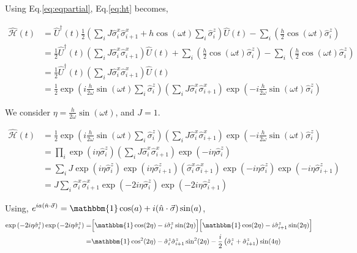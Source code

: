 \documentclass[a4paper,11pt]{article}
\begin{document}
Using Eq.\eqref{eq:eqpartial}, Eq.\eqref{eq:ht} becomes,


\begin{align*}
\hat{\mathcal{H}}(t) & =\hat{U}^{\dagger}(t) \frac{1}{2}\left(\sum_{i} J \hat{\sigma}_{i}^{x} \hat{\sigma}_{i+1}^{x}+h \cos (\omega t) \sum_{i} \hat{\sigma}_{i}^{z}\right) \hat{U}(t)-\sum_{i}\left(\frac{h}{2} \cos (\omega t) \hat{\sigma}_{i}^{z}\right) \nonumber\\
& =\frac{1}{2} \hat{U}^{\dagger}(t)\left(\sum_{i} J \hat{\sigma}_{i}^{x} \hat{\sigma}_{i+1}^{x}\right) \hat{U}(t)+\sum_{i}\left(\frac{h}{2} \cos (\omega t) \hat{\sigma}_{i}^{z}\right)-\sum_{i}\left(\frac{h}{2} \cos (\omega t) \hat{\sigma}_{i}^{z}\right) \nonumber\\
& =\frac{1}{2} \hat{U}^{\dagger}(t)\left(\sum_{i} J \hat{\sigma}_{i}^{x} \hat{\sigma}_{i+1}^{x}\right) \hat{U}(t) \nonumber\\
& =\frac{1}{2} \exp \left(i \frac{h}{2 \omega} \sin (\omega t) \sum_{i} \hat{\sigma}_{i}^{z}\right)\left(\sum_{i} J \hat{\sigma}_{i}^{x} \hat{\sigma}_{i+1}^{x}\right) \exp \left(-i \frac{h}{2 \omega} \sin (\omega t) \hat{\sigma}_{i}^{z}\right)\nonumber
\end{align*}

We consider $\eta=\frac{h}{2 \omega} \sin (\omega t)$, and $J=1$.


\begin{align}
\hat{\mathcal{H}}(t) & =\frac{1}{2} \exp \left(i \frac{h}{2 \omega} \sin (\omega t) \sum_{i} \hat{\sigma}_{i}^{z}\right)\left(\sum_{i} J \hat{\sigma}_{i}^{x} \hat{\sigma}_{i+1}^{x}\right) \exp \left(-i \frac{h}{2 \omega} \sin (\omega t) \hat{\sigma}_{i}^{z}\right) \nonumber\\
&= \prod_i \exp\left(i\eta\hat{\sigma}^z_i\right)\left(\sum_{i} J \hat{\sigma}_{i}^{x} \hat{\sigma}_{i+1}^{x}\right)\exp\left(-i\eta\hat{\sigma}^z_i\right)\nonumber\\
&= \sum_i J \exp(i\eta\hat{\sigma}^z_i)\exp(i\eta\hat{\sigma}^z_{i+1})\left( \hat{\sigma}_{i}^{x} \hat{\sigma}_{i+1}^{x}\right)\exp(-i\eta\hat{\sigma}^z_i)\exp(-i\eta\hat{\sigma}^z_{i+1})\nonumber\\
&= J\sum_{i} \hat{\sigma}_{i}^{x} \hat{\sigma}_{i+1}^{x}\exp(-2i\eta\hat{\sigma}^z_i)\exp(-2i\eta\hat{\sigma}^z_{i+1})
\label{eq:hmov}
\end{align}

Using, $\displaystyle e^{ia(\hat{n}\cdot \vec{\sigma})} = \mathbbm{1} \cos(a) + i (\hat{n}\cdot \vec{\sigma})\sin(a)$, 
\begin{align}
\exp\left(-2i\eta\hat{\sigma}^z_i\right)\exp\left(-2i\eta\hat{\sigma}^z_i\right)
=& \Big[\mathbbm{1} \cos(2\eta) - i \hat{\sigma}^z_i\sin(2\eta)\Big]\Big[\mathbbm{1} \cos(2\eta) - i \hat{\sigma}^z_{i+1}\sin(2\eta)\Big]\nonumber\\
=& \mathbbm{1} \cos^2(2\eta) - \hat{\sigma}^z_i\hat{\sigma}^z_{i+1}\sin^2(2\eta) -\frac{i}{2} \left(\hat{\sigma}^z_i+ \hat{\sigma}^z_{i+1}\right)\sin(4\eta)
\label{eq:op}
\end{align}
\end{document}
